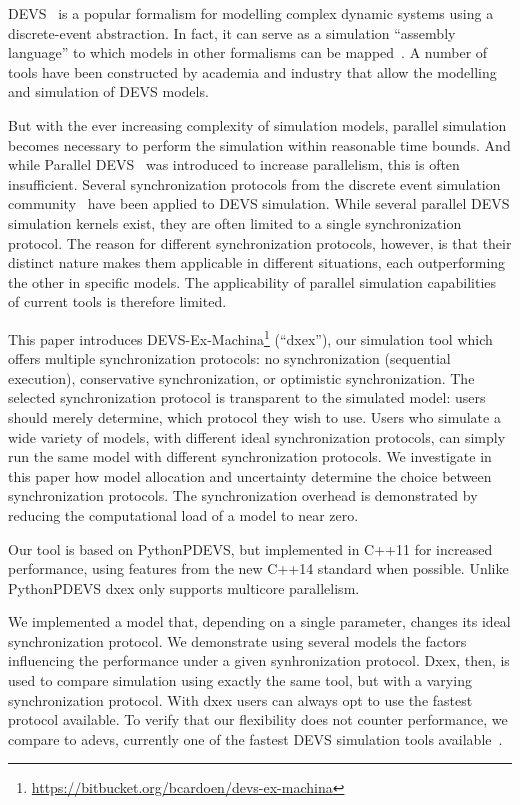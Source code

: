 \textsf{DEVS}~\cite{ClassicDEVS} is a popular formalism for modelling complex dynamic systems using a discrete-event abstraction.
In fact, it can serve as a simulation ``assembly language'' to which models in other formalisms can be mapped~\cite{DEVSbase}.
A number of tools have been constructed by academia and industry that allow the modelling and simulation of \textsf{DEVS} models.

But with the ever increasing complexity of simulation models, parallel simulation becomes necessary to perform the simulation within reasonable time bounds.
And while \textsf{Parallel DEVS}~\cite{ParallelDEVS} was introduced to increase parallelism, this is often insufficient.
Several synchronization protocols from the discrete event simulation community~\cite{FujimotoBook} have been applied to \textsf{DEVS} simulation.
While several parallel \textsf{DEVS} simulation kernels exist, they are often limited to a single synchronization protocol.
The reason for different synchronization protocols, however, is that their distinct nature makes them applicable in different situations, each outperforming the other in specific models.
The applicability of parallel simulation capabilities of current tools is therefore limited.

This paper introduces DEVS-Ex-Machina\footnote{\url{https://bitbucket.org/bcardoen/devs-ex-machina}} (``dxex''), our simulation tool which offers multiple synchronization protocols: no synchronization (sequential execution), conservative synchronization, or optimistic synchronization.
The selected synchronization protocol is transparent to the simulated model: users should merely determine, which protocol they wish to use.
Users who simulate a wide variety of models, with different ideal synchronization protocols, can simply run the same model with different synchronization protocols.
We investigate in this paper how model allocation and uncertainty determine the choice between synchronization protocols. 
The synchronization overhead is demonstrated by reducing the computational load of a model to near zero. 

Our tool is based on PythonPDEVS, but implemented in C++11 for increased performance, using features from the new C++14 standard when possible.
Unlike PythonPDEVS dxex only supports multicore parallelism.

We implemented a model that, depending on a single parameter, changes its ideal synchronization protocol. We demonstrate using several models the factors influencing the performance under a given synhronization protocol.
Dxex, then, is used to compare simulation using exactly the same tool, but with a varying synchronization protocol. With dxex users can always opt to use the fastest protocol available.
To verify that our flexibility does not counter performance, we compare to adevs, currently one of the fastest \textsf{DEVS} simulation tools available~\cite{PythonPDEVS,DEVSSurvey}.

